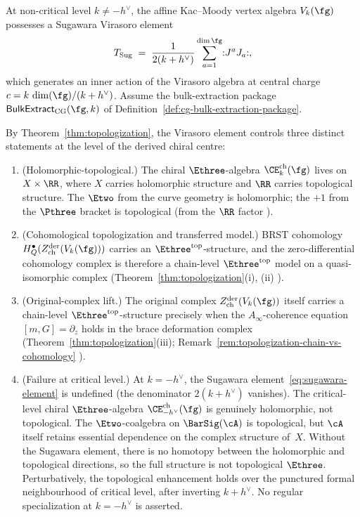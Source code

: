 \begin{proposition}
\label{prop:khan-zeng-topological}
\ClaimStatusConditional
At non-critical level $k \neq -h^\vee$, the affine
Kac--Moody vertex algebra $V_k(\fg)$ possesses a Sugawara
Virasoro element
\begin{equation}\label{eq:sugawara-element}
 T_{\mathrm{Sug}} \;=\;
 \frac{1}{2(k + h^\vee)}
 \sum_{a=1}^{\dim \fg}
 \mathopen{:} J^a J_a \mathclose{:},
\end{equation}
which generates an inner action of the Virasoro algebra at
central charge $c = k\,\dim(\fg)/(k + h^\vee)$.
Assume the bulk-extraction package
$\mathsf{BulkExtract}_{\mathrm{CG}}(\fg,k)$ of
Definition~\ref{def:cg-bulk-extraction-package}.

By Theorem~\ref{thm:topologization}, the Virasoro element
controls three distinct statements at the level of the
derived chiral centre:
\begin{enumerate}[label=\textup{(\roman*)}]
\item \textup{(Holomorphic-topological.)}
 The chiral $\Ethree$-algebra
 $\CE^{\mathrm{ch}}_k(\fg)$ lives on $X \times \RR$,
 where $X$ carries holomorphic structure and $\RR$
 carries topological structure. The $\Etwo$ from the
 curve geometry is holomorphic; the $+1$ from the $\Pthree$
 bracket is topological \textup{(}from the $\RR$ factor%
 \textup{)}.
 \item \textup{(Cohomological topologization and transferred model.)}
 BRST cohomology
 $H_Q^\bullet(Z^{\mathrm{der}}_{\mathrm{ch}}(V_k(\fg)))$
 carries an $\Ethree^{\mathrm{top}}$-structure, and the
 zero-differential cohomology complex is therefore a
 chain-level $\Ethree^{\mathrm{top}}$ model on a
 quasi-isomorphic complex
 \textup{(}Theorem~\textup{\ref{thm:topologization}(i), (ii)}%
 \textup{)}.
\item \textup{(Original-complex lift.)}
 The original complex
 $Z^{\mathrm{der}}_{\mathrm{ch}}(V_k(\fg))$ itself carries a
 chain-level $\Ethree^{\mathrm{top}}$-structure precisely
 when the $A_\infty$-coherence equation
 $[m,G]=\partial_z$ holds in the brace deformation complex
 \textup{(}Theorem~\textup{\ref{thm:topologization}(iii)};
 Remark~\textup{\ref{rem:topologization-chain-vs-cohomology}}%
 \textup{)}.
\item \textup{(Failure at critical level.)}
 At $k = -h^\vee$, the Sugawara element~\eqref{eq:sugawara-element}
 is undefined \textup{(}the denominator $2(k+h^\vee)$
 vanishes\textup{)}. The critical-level chiral
 $\Ethree$-algebra $\CE^{\mathrm{ch}}_{-h^\vee}(\fg)$ is
 genuinely holomorphic, not topological. The
 $\Etwo$-coalgebra on $\BarSig(\cA)$ is topological, but
 $\cA$ itself retains essential dependence on the complex
 structure of~$X$.
 Without the Sugawara element, there is no homotopy
 between the holomorphic and topological directions,
 so the full structure is not topological $\Ethree$.
 Perturbatively, the topological enhancement holds over the
 punctured formal neighbourhood of critical level, after
 inverting $k+h^\vee$. No regular specialization at
 $k=-h^\vee$ is asserted.
\end{enumerate}
\end{proposition}

